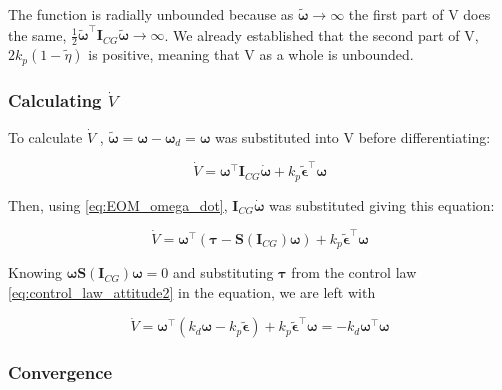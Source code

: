 The function is radially unbounded because as $\tilde{\boldsymbol{\omega}}\rightarrow \infty$ the first part of V does the same, $\frac{1}{2} \tilde{\boldsymbol{\omega}}^{\top} \mathbf{I}_{CG}\tilde{\boldsymbol{\omega}} \rightarrow \infty$. We already established that the second part of V, $2 k_p (1-\tilde{\eta})$ is positive, meaning that V as a whole is unbounded.

\subsubsection*{Calculating $\dot{V}$ }

To calculate $\dot{V}$ , $\tilde{\boldsymbol{\omega}} = \boldsymbol{\omega} - \boldsymbol{\omega}_d = \boldsymbol{\omega}$ was substituted into V before differentiating:

\begin{equation}
    \dot{V} = \boldsymbol{\omega}^\top\mathbf{I}_{CG}\dot{\boldsymbol{\omega}} + k_p\tilde{\boldsymbol{\epsilon}}^\top\boldsymbol{\omega} 
\end{equation}

Then, using \eqref{eq:EOM_omega_dot}, $\mathbf{I}_{CG}\dot{\boldsymbol{\omega}}$ was substituted giving this equation:

\begin{equation}
    \dot{V} = \boldsymbol{\omega}^\top(\boldsymbol{\tau} - \mathbf{S}(\mathbf{I}_{CG})\boldsymbol{\omega}) + k_p\tilde{\boldsymbol{\epsilon}}^\top \boldsymbol{\omega }
\end{equation}

Knowing $\boldsymbol{\omega}\mathbf{S}(\mathbf{I}_{CG})\boldsymbol{\omega} = 0$ and substituting $\boldsymbol{\tau}$ from the control law \eqref{eq:control_law_attitude2} in the equation, we are left with

\begin{equation}
    \dot{V} = \boldsymbol{\omega}^\top( k_d \boldsymbol{\omega} - k_p\tilde{\boldsymbol{\epsilon}}) + k_p\tilde{\boldsymbol{\epsilon}}^\top\boldsymbol{\omega} = -k_d\boldsymbol{\omega}^\top\boldsymbol{\omega}
\end{equation}


\subsubsection*{Convergence}

